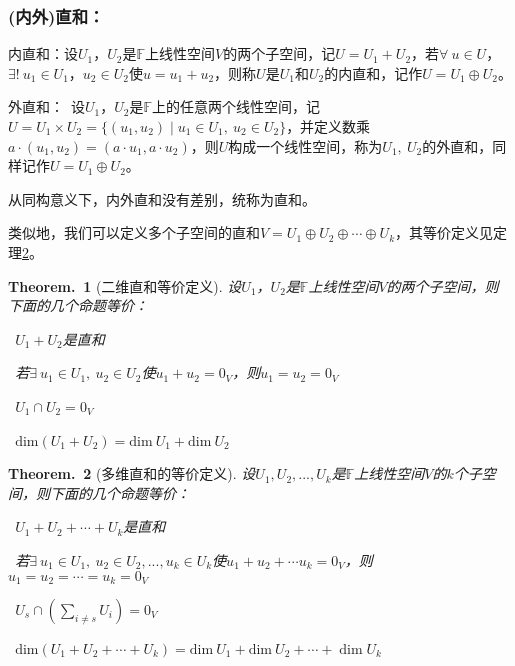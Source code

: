 \documentclass[zihao=-4,UTF8]{report}
\theoremstyle{mystyle} %
\newtheorem{theorem}{Theorem.\,}
\begin{document}
\subsubsection{(内外)直和：}
内直和：设$U_1$，$U_2$是$\mathbb{F}$上线性空间$V$的两个子空间，记$U = U_1+U_2$，若$\forall\  u \in U$，$\exists !\  u_1\in U_1$，$u_2 \in U_2$使$u = u_1 +u_2$，则称$U$是$U_1$和$U_2$的内直和，记作$U =U_1 \oplus U_2$。\par 
外直和：\ 设$U_1$，$U_2$是$\mathbb{F}$上的任意两个线性空间，记$U = U_1\times U_2 = \{(u_1,u_2)\mid u_1\in U_1,\ u_2\in U_2\}$，并定义数乘$a\cdot(u_1,u_2) = (a\cdot u_1,a\cdot u_2)$，则$U$构成一个线性空间，称为$U_1,\ U_2$的外直和，同样记作$U = U_1\oplus U_2$。\par
从同构意义下，内外直和没有差别，统称为直和。\par
类似地，我们可以定义多个子空间的直和$V = U_1 \oplus U_2 \oplus \cdots \oplus U_k$，其等价定义见定理\ref{多维直和的等价定义}。

\begin{theorem}[二维直和等价定义]
    设$U_1$，$U_2$是$\mathbb{F}$上线性空间$V$的两个子空间，则下面的几个命题等价：\par
    \ $U_1+U_2$是直和
    \par
    \ 若$\exists\  u_1\in U_1,\ u_2 \in U_2$使$ u_1 +u_2=0_{V}$，则$u_1=u_2=0_{V}$
    \par
    \ $U_1\cap U_2=0_{V}$
    \par
    \ $\text{dim}(U_1+U_2)= \text{dim}\ U_1 + \text{dim}\ U_2 $ 
    \par
\end{theorem}
\begin{theorem}[多维直和的等价定义]\label{多维直和的等价定义}
    设$U_1 ,U_2 , ..., U_k$是$\mathbb{F}$上线性空间$V$的$k$个子空间，则下面的几个命题等价：\par
    \ $U_1+U_2+\cdots + U_k$是直和
    \par
    \ 若$\exists\  u_1\in U_1,\ u_2 \in U_2,...,u_k \in U_k$使$ u_1 +u_2+ \cdots u_k= 0_{V}$，则$u_1=u_2=\cdots =u_k=0_{V}$
    \par
    \ $ U_s\cap (\underset{i\ne s}{\sum}U_i)  =0_{V}$
    \par
    \ $\text{dim}(U_1+U_2+\cdots + U_k)= \text{dim}\ U_1 + \text{dim}\ U_2 +\cdots + \dim U_k$ 
    \par
\end{theorem}
\end{document}
